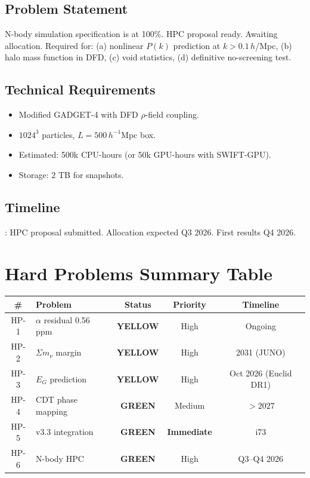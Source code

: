 \documentclass[11pt,a4paper]{article}
\newcommand{\GREEN}{\textcolor{dfdgreen}{\textbf{GREEN}}}
\newcommand{\YELLOW}{\textcolor{dfdyellow}{\textbf{YELLOW}}}
\begin{document}
\subsection{Problem Statement}
N-body simulation specification is at 100\%. HPC proposal ready. Awaiting allocation. Required for: (a) nonlinear $P(k)$ prediction at $k > 0.1\,h$/Mpc, (b) halo mass function in DFD, (c) void statistics, (d) definitive no-screening test.

\subsection{Technical Requirements}
\begin{itemize}[nosep]
\item Modified GADGET-4 with DFD $\rho$-field coupling.
\item $1024^3$ particles, $L = 500\,h^{-1}$Mpc box.
\item Estimated: 500k CPU-hours (or 50k GPU-hours with SWIFT-GPU).
\item Storage: 2 TB for snapshots.
\end{itemize}

\subsection{Timeline}: HPC proposal submitted. Allocation expected Q3 2026. First results Q4 2026.

\section{Hard Problems Summary Table}

\begin{center}
\begin{tabular}{clccc}
\toprule
\textbf{\#} & \textbf{Problem} & \textbf{Status} & \textbf{Priority} & \textbf{Timeline} \\
\midrule
HP-1 & $\alpha$ residual 0.56 ppm & \YELLOW & High & Ongoing \\
HP-2 & $\Sigma m_\nu$ margin & \YELLOW & High & 2031 (JUNO) \\
HP-3 & $E_G$ prediction & \YELLOW & High & Oct 2026 (Euclid DR1) \\
HP-4 & CDT phase mapping & \GREEN & Medium & $>2027$ \\
HP-5 & v3.3 integration & \GREEN & \textbf{Immediate} & i73 \\
HP-6 & N-body HPC & \GREEN & High & Q3--Q4 2026 \\
\bottomrule
\end{tabular}
\end{center}
\end{document}
